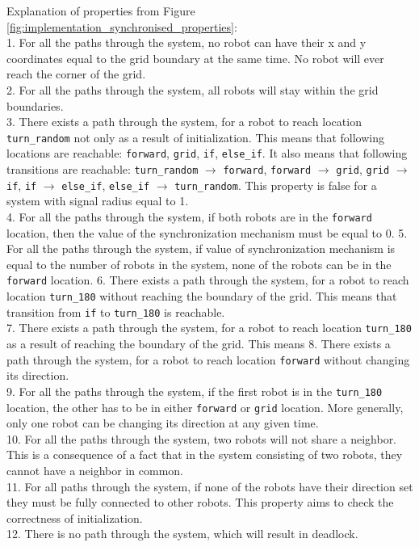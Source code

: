 \noindent
Explanation of properties from Figure \ref{fig:implementation_synchronised_properties}:\\
1. For all the paths through the system, no robot can have their x and y coordinates equal to the grid boundary at the same time. No robot will ever reach the corner of the grid.\\
2. For all the paths through the system, all robots will stay within the grid boundaries.\\
3. There exists a path through the system, for a robot to reach location \texttt{turn\_random} not only as a result of initialization. This means that following locations are reachable: \texttt{forward}, \texttt{grid}, \texttt{if}, \texttt{else\_if}. It also means that following transitions are reachable: \texttt{turn\_random} $\rightarrow$ \texttt{forward}, \texttt{forward} $\rightarrow$ \texttt{grid}, \texttt{grid} $\rightarrow$ \texttt{if}, \texttt{if} $\rightarrow$ \texttt{else\_if}, \texttt{else\_if} $\rightarrow$ \texttt{turn\_random}. This property is false for a system with signal radius equal to 1.\\ 
4. For all the paths through the system, if both robots are in the \texttt{forward} location, then the value of the synchronization mechanism must be equal to 0.
5. For all the paths through the system, if value of synchronization mechanism is equal to the number of robots in the system, none of the robots can be in the \texttt{forward} location.
6. There exists a path through the system, for a robot to reach location \texttt{turn\_180} without reaching the boundary of the grid. This means that transition from \texttt{if} to \texttt{turn\_180} is reachable.\\
7. There exists a path through the system, for a robot to reach location \texttt{turn\_180} as a result of reaching the boundary of the grid. This means 
8. There exists a path through the system, for a robot to reach location \texttt{forward} without changing its direction.\\
9. For all the paths through the system, if the first robot is in the \texttt{turn\_180} location, the other has to be in either \texttt{forward} or \texttt{grid} location. More generally, only one robot can be changing its direction at any given time.\\ 
10. For all the paths through the system, two robots will not share a neighbor. This is a consequence of a fact that in the system consisting of two robots, they cannot have a neighbor in common.\\
11. For all paths through the system, if none of the robots have their direction set they must be fully connected to other robots. This property aims to check the correctness of initialization. \\
12. There is no path through the system, which will result in deadlock.\\



